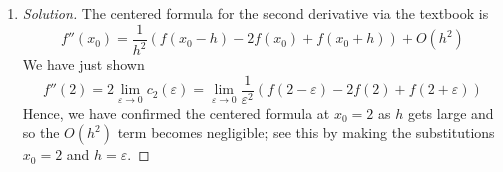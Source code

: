 \documentclass{article}
\newcommand{\ep}{{\varepsilon}}
\begin{document}
\begin{enumerate}
\begin{proof}[Solution]
\begin{align*}
			\lim_{\ep \to 0} c_2(\ep)
			&= \lim_{\ep\to0} \frac{y_1 + y_2 - 2y_0}{2\ep^2}\\
			&= \lim_{\ep\to0} \frac{f(2+\ep) + f(2-\ep) -2f(2)}{2\ep^2}\\
			&= \lim_{\ep \to 0} \frac{f'(2+\ep) - f'(2-\ep)}{4\ep}\\
			&= \lim_{\ep \to 0} \frac{f''(2+\ep) + f''(2-\ep)}{4}\\
			&= \frac12f''(2)
		\end{align*}
		where L'\^{o}pital's can be applied twice here,
		since $f$ is twice differentiable,
		and for the first use, $\lim_{\ep \to 0} f(2+\ep) + f(2-\ep) -2f(2) =
		f(2) + f(2) - 2f(2)$
		and $\lim_{\ep \to 0} 2\ep^2 = 0$,
		and for the second use, $\lim_{\ep \to 0} f'(2+\ep) - f'(2-\ep)
		= f'(2) - f'(2) = 0$ and $\lim_{\ep \to 0} 4\ep = 0$.
	\end{proof}
	\item \begin{proof}[Solution]\let\qed\relax
		The centered formula for the second derivative via the textbook is
		\[
			f''(x_0) = \frac{1}{h^2}(f(x_0 - h) - 2f(x_0) + f(x_0 + h))
			+ O(h^2)
		\]
		We have just shown
		\[
			f''(2) = 2\lim_{\ep \to 0} c_2(\ep)
			= \lim_{\ep\to0}\frac{1}{\ep^2}(f(2-\ep) - 2f(2) + f(2+\ep))
		\]
		Hence, we have confirmed the centered formula at $x_0 = 2$ as $h$ gets large
		and so the $O(h^2)$ term becomes negligible;
		see this by making the substitutions $x_0 = 2$ and $h = \ep$.
	\end{proof}
\end{enumerate}
\end{document}
